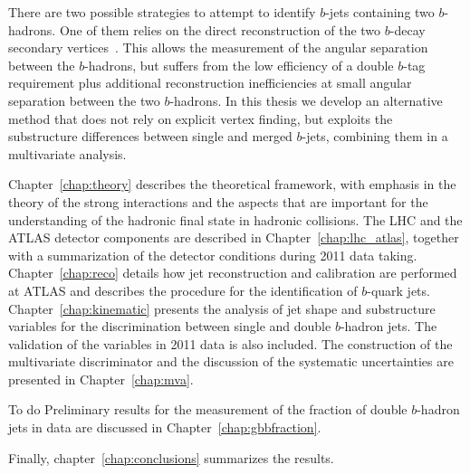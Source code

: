



There are two possible strategies to attempt to identify $b$-jets containing two $b$-hadrons. One of them relies on the direct reconstruction of the two $b$-decay secondary vertices~\cite{CDFAzimutalCorrelation}. This %
allows the measurement of the angular separation between the $b$-hadrons, but suffers from the low efficiency of a double $b$-tag requirement plus additional reconstruction inefficiencies at small angular separation between the two $b$-hadrons. In this thesis we develop an alternative method that does not rely on explicit vertex finding, but exploits the substructure differences between single and merged $b$-jets, combining them in a multivariate analysis. 

Chapter~\ref{chap:theory} describes the theoretical framework, with emphasis in the theory of the strong interactions and the aspects that are important for the understanding of the hadronic final state in hadronic collisions. The LHC and the ATLAS detector components  are described in Chapter~\ref{chap:lhc_atlas}, together with a summarization of the detector conditions during 2011 data taking.  Chapter~\ref{chap:reco} details how jet reconstruction and calibration are performed at ATLAS and describes the procedure for the identification of $b$-quark jets. Chapter~\ref{chap:kinematic} presents the analysis of jet shape and substructure variables for the discrimination between single and double $b$-hadron jets. The validation of the variables in 2011 data is also included.   The construction of the multivariate discriminator  and the discussion of the systematic uncertainties are presented in Chapter~\ref{chap:mva}. 

{\sc To do}
Preliminary results for the measurement of the fraction of double $b$-hadron jets in data are discussed in Chapter~\ref{chap:gbbfraction}. 

Finally, chapter~\ref{chap:conclusions} summarizes the results. 
